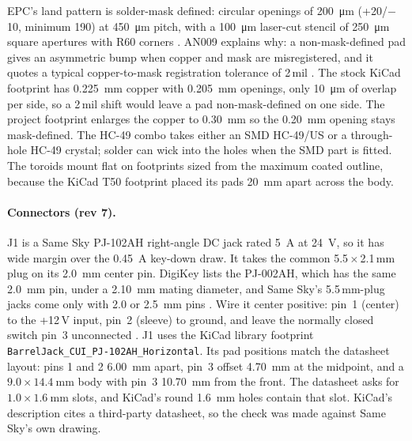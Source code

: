 \documentclass[11pt,letterpaper]{article}
\begin{document}
EPC's land pattern is solder-mask defined: circular openings of \SI{200}{\micro\meter} (+20/$-$10, minimum 190) at \SI{450}{\micro\meter} pitch, with a \SI{100}{\micro\meter} laser-cut stencil of \SI{250}{\micro\meter} square apertures with R60 corners \cite[p.~6]{epc2036ds}. AN009 explains why: a non-mask-defined pad gives an asymmetric bump when copper and mask are misregistered, and it quotes a typical copper-to-mask registration tolerance of 2\,mil \cite[pp.~2--3]{epcan009}. The stock KiCad footprint has \SI{0.225}{\milli\meter} copper with \SI{0.205}{\milli\meter} openings, only \SI{10}{\micro\meter} of overlap per side, so a 2\,mil shift would leave a pad non-mask-defined on one side. The project footprint enlarges the copper to \SI{0.30}{\milli\meter} so the \SI{0.20}{\milli\meter} opening stays mask-defined. The HC-49 combo takes either an SMD HC-49/US or a through-hole HC-49 crystal; solder can wick into the holes when the SMD part is fitted. The toroids mount flat on footprints sized from the maximum coated outline, because the KiCad T50 footprint placed its pads \SI{20}{\milli\meter} apart across the body.

\paragraph{Connectors (rev 7).} J1 is a Same Sky PJ-102AH right-angle DC jack rated \SI{5}{\ampere} at \SI{24}{\volt}, so it has wide margin over the \SI{0.45}{\ampere} key-down draw. It takes the common 5.5\,$\times$\,2.1\,mm plug on its \SI{2.0}{\milli\meter} center pin. DigiKey lists the PJ-002AH, which has the same \SI{2.0}{\milli\meter} pin, under a \SI{2.10}{\milli\meter} mating diameter, and Same Sky's 5.5\,mm-plug jacks come only with 2.0 or \SI{2.5}{\milli\meter} pins \cite{projkicad}. Wire it center positive: pin~1 (center) to the +12\,V input, pin~2 (sleeve) to ground, and leave the normally closed switch pin~3 unconnected \cite{sameskyPJ102AH}. J1 uses the KiCad library footprint \texttt{BarrelJack\_CUI\_PJ-102AH\_Horizontal}. Its pad positions match the datasheet layout: pins 1 and 2 \SI{6.00}{\milli\meter} apart, pin~3 offset \SI{4.70}{\milli\meter} at the midpoint, and a $9.0\times\SI{14.4}{\milli\meter}$ body with pin~3 \SI{10.70}{\milli\meter} from the front. The datasheet asks for $1.0\times\SI{1.6}{\milli\meter}$ slots, and KiCad's round \SI{1.6}{\milli\meter} holes contain that slot. KiCad's description cites a third-party datasheet, so the check was made against Same Sky's own drawing.
\end{document}
